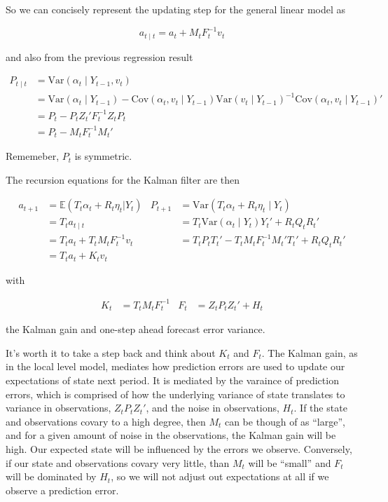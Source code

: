 \documentclass{tufte-book}
\begin{document}
So we can concisely represent the updating step for the general linear model as

\[
a_{t \mid t} = a_t + M_t F_t^{-1} v_t
\]

\noindent and also from the previous regression result

\begin{align*}
P_{t \mid t} &= \text{Var}(\alpha_t \mid Y_{t-1}, v_t) \\
&= \text{Var}(\alpha_t \mid Y_{t-1}) - \text{Cov}(\alpha_t, v_t \mid Y_{t-1}) \text{Var}(v_t \mid Y_{t-1})^{-1} \text{Cov}(\alpha_t, v_t \mid Y_{t-1})' \\
&= P_t - P_t Z_t' F_t^{-1} Z_t P_t \\
&= P_t - M_t F_t^{-1} M_t'
\end{align*}

\noindent Rememeber, $P_t$ is symmetric.

The recursion equations for the Kalman filter are then

\begin{align*}
a_{t+1} &= \mathbb{E}(T_t \alpha_t + R_t \eta_t | Y_t) & P_{t+1} &= \text{Var}(T_t \alpha_t + R_t \eta_t \mid Y_t) \\
&= T_t a_{t \mid t} & &= T_t \text{Var}(\alpha_t \mid Y_t) Y_t' + R_t Q_t R_t' \\
&= T_t a_t + T_t M_t F_t^{-1} v_t  & &= T_t P_t T_t' - T_t M_t F_t^{-1} M_t' T_t' + R_t Q_t R_t' \\
&= T_t a_t + K_t v_t & &
\end{align*}

\noindent with

\begin{align*}
K_t &= T_t M_t F_t^{-1} & F_t &= Z_t P_t Z_t' + H_t
\end{align*}

\noindent the Kalman gain and one-step ahead forecast error variance.

It's worth it to take a step back and think about $K_t$ and $F_t$. The Kalman gain, as in the local level model, mediates how prediction errors are used to update our expectations of state next period. It is mediated by the varaince of prediction errors, which is comprised of how the underlying variance of state translates to variance in observations, $Z_t P_t Z_t'$, and the noise in observations, $H_t$. If the state and observations covary to a high degree, then $M_t$ can be though of as ``large'', and for a given amount of noise in the observations, the Kalman gain will be high. Our expected state will be influenced by the errors we observe. Conversely, if our state and observations covary very little, than $M_t$ will be ``small'' and $F_t$ will be dominated by $H_t$, so we will not adjust out expectations at all if we observe a prediction error.
\end{document}
